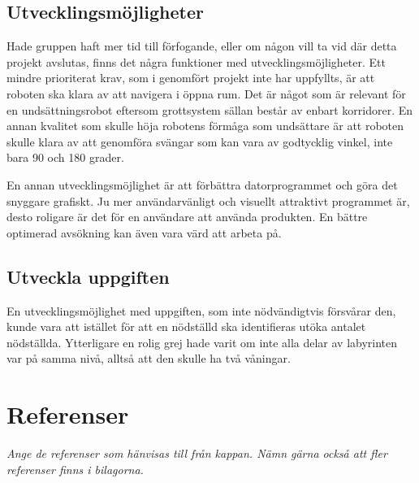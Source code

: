 \documentclass[11pt]{article}
\begin{document}
\begin{flushleft}
\subsection{Utvecklingsmöjligheter}
Hade gruppen haft mer tid till förfogande, eller om någon vill ta vid där detta projekt avslutas, finns det några funktioner med utvecklingsmöjligheter. Ett mindre prioriterat krav, som i genomfört projekt inte har uppfyllts, är att roboten ska klara av att navigera i öppna rum. Det är något som är relevant för en undsättningsrobot eftersom grottsystem sällan består av enbart korridorer. En annan kvalitet som skulle höja robotens förmåga som undsättare är att roboten skulle klara av att genomföra svängar som kan vara av godtycklig vinkel, inte bara 90 och 180 grader. 

En annan utvecklingsmöjlighet är att förbättra datorprogrammet och göra det snyggare grafiskt. Ju mer användarvänligt och visuellt attraktivt programmet är, desto roligare är det för en användare att använda produkten. En bättre optimerad avsökning kan även vara värd att arbeta på.

\subsection{Utveckla uppgiften}
En utvecklingsmöjlighet med uppgiften, som inte nödvändigtvis försvårar den, kunde vara att istället för att en nödställd ska identifieras utöka antalet nödställda. Ytterligare en rolig grej hade varit om inte alla delar av labyrinten var på samma nivå, alltså att den skulle ha två våningar. 

\pagebreak

\section{Referenser}
\textit{Ange de referenser som hänvisas till från kappan. Nämn gärna också att fler referenser finns i bilagorna.}

\pagebreak
{}
%
%

\pagebreak


\appendix

\end{flushleft}
\end{document}
